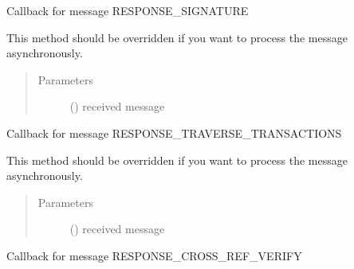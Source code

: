 \documentclass[letterpaper,10pt,english]{sphinxmanual}
\begin{document}
\begin{fulllineitems}
\begin{fulllineitems}
\label{\detokenize{bbc1.core.bbc_app:bbc1.core.bbc_app.Callback.proc_resp_sign_request}}
Callback for message RESPONSE\_SIGNATURE

This method should be overridden if you want to process the message asynchronously.
\begin{quote}\begin{description}
\item[{Parameters}] \leavevmode
{} () \textendash{} received message

\end{description}\end{quote}

\end{fulllineitems}


\begin{fulllineitems}
\label{\detokenize{bbc1.core.bbc_app:bbc1.core.bbc_app.Callback.proc_resp_traverse_transactions}}
Callback for message RESPONSE\_TRAVERSE\_TRANSACTIONS

This method should be overridden if you want to process the message asynchronously.
\begin{quote}\begin{description}
\item[{Parameters}] \leavevmode
{} () \textendash{} received message

\end{description}\end{quote}

\end{fulllineitems}


\begin{fulllineitems}
\label{\detokenize{bbc1.core.bbc_app:bbc1.core.bbc_app.Callback.proc_resp_verify_cross_ref}}
Callback for message RESPONSE\_CROSS\_REF\_VERIFY


\end{fulllineitems}
\end{fulllineitems}
\end{document}
